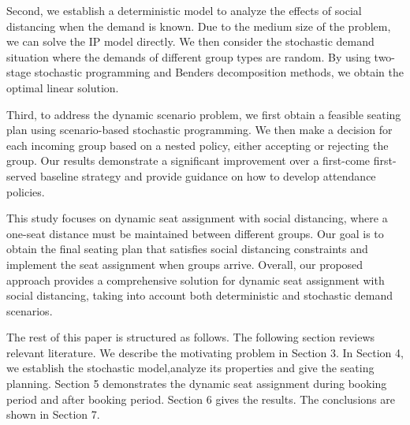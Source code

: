 Second, we establish a deterministic model to analyze the effects of social distancing when the demand is known. Due to the medium size of the problem, we can solve the IP model directly. We then consider the stochastic demand situation where the demands of different group types are random. By using two-stage stochastic programming and Benders decomposition methods, we obtain the optimal linear solution.

Third, to address the dynamic scenario problem, we first obtain a feasible seating plan using scenario-based stochastic programming. We then make a decision for each incoming group based on a nested policy, either accepting or rejecting the group. Our results demonstrate a significant improvement over a first-come first-served baseline strategy and provide guidance on how to develop attendance policies.

This study focuses on dynamic seat assignment with social distancing, where a one-seat distance must be maintained between different groups. Our goal is to obtain the final seating plan that satisfies social distancing constraints and implement the seat assignment when groups arrive. Overall, our proposed approach provides a comprehensive solution for dynamic seat assignment with social distancing, taking into account both deterministic and stochastic demand scenarios.






The rest of this paper is structured as follows. The following section reviews relevant literature. We describe the motivating problem in Section 3. In Section 4, we establish the stochastic model,analyze its properties and give the seating planning. Section 5 demonstrates the dynamic seat assignment during booking period and after booking period. Section 6 gives the results. The conclusions are shown in Section 7.



\newpage
